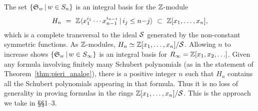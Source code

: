 The set $\{{\frak S}_{w}\,|\, w\in S_n\}$ is an
integral basis for 
the $\Bbb Z$-module 
$$
H_n \ =\  {\Bbb Z}\langle x_1^{i_1}\cdots x_{n-1}^{i_{n-1}}\,|\, i_j \leq n{-}j
\rangle \   \subset \   {\Bbb Z}[x_1,\ldots,x_n],
$$ 
which is a complete transversal to the ideal ${\cal S}$ generated by the 
non-constant symmetric functions.
As $\Bbb Z$-modules, $H_n \simeq {\Bbb Z}[x_1,\ldots,x_n]/{\cal S}$.
Allowing $n$ to increase shows 
 $\{{\frak S}_{w}\,|\, w\in S_\infty\}$ is an integral 
basis for $R_\infty = {\Bbb Z}[x_1,x_2,\ldots]$.
Given any formula involving finitely many Schubert polynomials
(as in the statement of Theorem~\ref{thm:pieri_analog}),
there is a positive integer $n$ such that $H_n$ contains all the Schubert 
polynomials appearing in that formula.
Thus it is no loss of generality in proving formulas in the rings 
${\Bbb Z}[x_1,\ldots,x_n]/{\cal S}$.
This is the approach we take in \S\S1--3.

